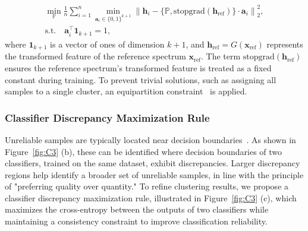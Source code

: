 \begin{equation}
    \begin{gathered} \label{cluster}
        \min_{\mathbb{P}} \frac{1}{n} \sum_{i=1}^n \min_{\bm{a}_i \in \{0,1\}^{k+1}} \left\| \bm{h}_i - \{\mathbb{P}, \text{stopgrad}(\bm{h}_{\text{ref}})\} \cdot \bm{a}_i \right\|_2^2, \\
        \text{s.t.} \quad \bm{a}_i^{\top} \bm{1}_{k+1} = 1,
    \end{gathered}
\end{equation}
where $\bm{1}_{k+1}$ is a vector of ones of dimension $k+1$, and $\bm{h}_{\text{ref}} = G(\bm{x}_{\text{ref}})$ represents the transformed feature of the reference spectrum $\bm{x}_{\text{ref}}$. The term $\text{stopgrad}(\bm{h}_{\text{ref}})$ ensures the reference spectrum's transformed feature is treated as a fixed constant during training. To prevent trivial solutions, such as assigning all samples to a single cluster, an equipartition constraint~\cite{caron2020unsupervised} is applied.

\subsubsection{Classifier Discrepancy Maximization Rule}\label{sec:3.2.2}
Unreliable samples are typically located near decision boundaries~\cite{Hearst1998}. As shown in Figure~\ref{fig:C3} (b), these can be identified where decision boundaries of two classifiers, trained on the same dataset, exhibit discrepancies. Larger discrepancy regions help identify a broader set of unreliable samples, in line with the principle of "preferring quality over quantity." To refine clustering results, we propose a classifier discrepancy maximization rule, illustrated in Figure~\ref{fig:C3} (c), which maximizes the cross-entropy between the outputs of two classifiers while maintaining a consistency constraint to improve classification reliability.

